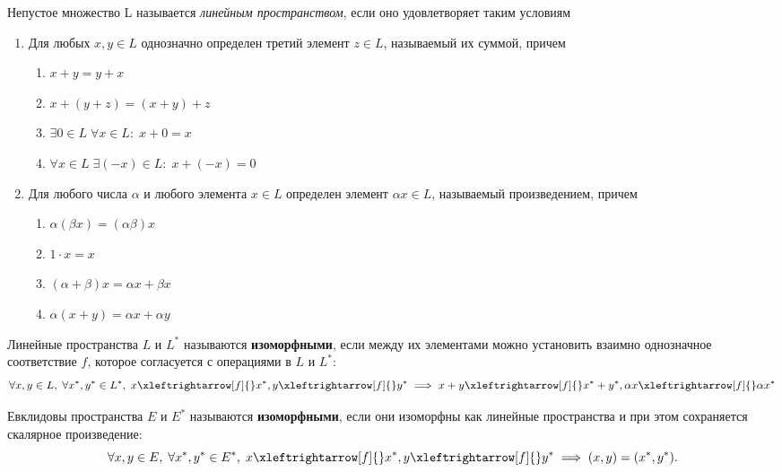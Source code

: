 \begin{definition}
    Непустое множество L называется \textit{линейным пространством}, если оно удовлетворяет таким условиям
    \begin{enumerate}
        \item Для любых $x, y \in L$ однозначно определен третий элемент $z \in L$, называемый их суммой, причем \begin{enumerate}
            \item $x + y = y + x$
            \item $x + (y + z) = (x + y) + z$
            \item $\exists 0 \in L \; \forall x \in L:\; x + 0 = x$
            \item $\forall x \in L \; \exists (-x) \in L:\; x + (-x) = 0$
        \end{enumerate}
        \item Для любого числа $\alpha$ и любого элемента $x \in L$ определен элемент $\alpha x \in L$, называемый произведением, причем
        \begin{enumerate}
            \item $\alpha (\beta x) = (\alpha \beta) x$
            \item $1 \cdot x = x$
            \item $(\alpha + \beta) x = \alpha x + \beta x$
            \item $\alpha (x + y) = \alpha x + \alpha y$
        \end{enumerate}
    \end{enumerate}
\end{definition}

\begin{definition}
    Линейные пространства $L$ и $L^*$ называются \textbf{изоморфными}, если между их элементами можно установить взаимно однозначное соответствие $f$, которое согласуется с операциями в $L$ и $L^*$:
    \[
    \forall x, y \in L,\; \forall x^*, y^* \in L^*,\; x \xleftrightarrow[f]{} x^*,  y \xleftrightarrow[f]{} y^* \implies x + y \xleftrightarrow[f]{} x^* + y^*, \alpha x  \xleftrightarrow[f]{} \alpha x^*
    \]
\end{definition}

\begin{definition}
    Евклидовы пространства $E$ и $E^*$ называются \textbf{изоморфными}, если они изоморфны как линейные пространства и при этом сохраняется скалярное произведение:
     \[
    \forall x, y \in E,\; \forall x^*, y^* \in E^*,\; x \xleftrightarrow[f]{} x^*,  y \xleftrightarrow[f]{} y^* \implies (x, y) = (x^*, y^*).
    \]
\end{definition}

